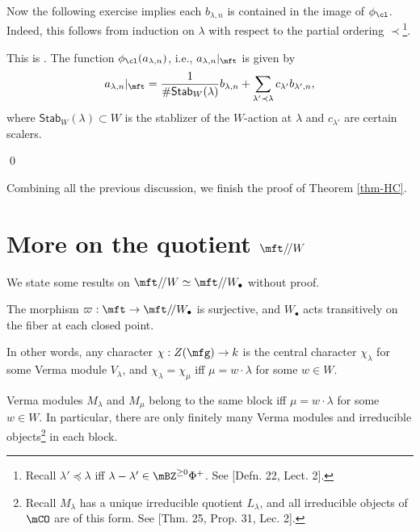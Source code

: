 		Now the following exercise implies each $b_{\lambda,n}$ is contained in the image of $\phi_\cl$. Indeed, this follows from induction on $\lambda$ with respect to the partial ordering $\prec$\footnote{Recall $\lambda'\preceq\lambda$ iff $\lambda-\lambda' \in \mBZ^{\ge 0}\Phi^+$. See [Defn. 22, Lect. 2].}.

		\begin{exe}
			This is . The function $\phi_\cl(a_{\lambda,n})$, i.e., $a_{\lambda,n}|_{\mft}$ is given by
			\[
				a_{\lambda,n}|_{\mft} = \frac{1}{\#\mathsf{Stab}_W(\lambda)}b_{\lambda,n} + \sum_{\lambda' \prec \lambda} c_{\lambda'}b_{\lambda',n},
			\]
			where $\mathsf{Stab}_W(\lambda)\subset W$ is the stablizer of the $W$-action at $\lambda$ and $c_{\lambda'}$ are certain scalers.

		\end{exe}

	\qed

	Combining all the previous discussion, we finish the proof of Theorem \ref{thm-HC}.

\section{More on the quotient \texorpdfstring{$\mft/\!/W$}{t//W}}

	We state some results on $\mft/\!/W\simeq \mft/\!/W_\bullet$ without proof.

	\begin{prop}[{\!\!\cite[Sect. 1.10]{H2}}]
		The morphism $\varpi:\mft \to \mft/\!/W_\bullet$ is surjective, and $W_\bullet$ acts transitively on the fiber at each closed point.
	\end{prop}

	\begin{rem}
		In other words, any character $\chi:Z(\mfg) \to k$ is the central character $\chi_\lambda$ for some Verma module $V_\lambda$, and $\chi_\lambda =\chi_\mu$ iff $\mu=w\cdot \lambda$ for some $w\in W$.
	\end{rem}

	\begin{cor}
	Verma modules $M_\lambda$ and $M_\mu$ belong to the same block iff $\mu = w\cdot \lambda$ for some $w\in W$. In particular, there are only finitely many Verma modules and irreducible objects\footnote{Recall $M_\lambda$ has a unique irreducible quotient $L_\lambda$, and all irreducible objects of $\mCO$ are of this form. See [Thm. 25, Prop. 31, Lec. 2].} in each block.
	\end{cor}

